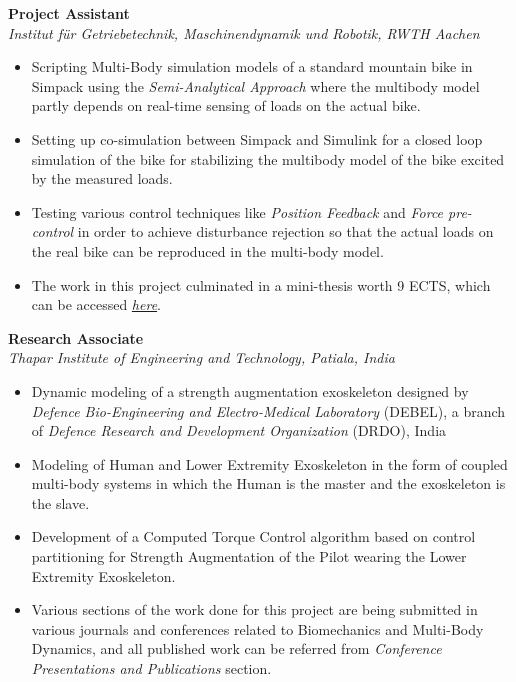 \vspace{0.1 in}

\large{\textbf{Project Assistant}}
\hfill
\minithesisdate\\
\emph{\large{Institut für Getriebetechnik, Maschinendynamik und Robotik, RWTH Aachen}}
\begin{itemize}
\item \large{Scripting Multi-Body simulation models of a standard mountain bike in Simpack using the \emph{Semi-Analytical Approach} where the multibody model partly depends on real-time sensing of loads on the actual bike.}
\item\large{Setting up co-simulation between Simpack and Simulink for a closed loop simulation of the bike for stabilizing the multibody model of the bike excited by the measured loads.}
\item\large{Testing various control techniques like \emph{Position Feedback} and \emph{Force pre-control} in order to achieve disturbance rejection so that the actual loads on the real bike can be reproduced in the multi-body model}.
\item\large{The work in this project culminated in a mini-thesis worth 9 ECTS, which can be accessed \href{https://github.com/average-engineer/MiniThesis_IGMR/blob/master/Thesis.pdf}{\large{\textit{here}}}.}
\end{itemize}

\vspace{0.1 in}

\large{\textbf{Research Associate}}
\hfill
\drdodate\\
\emph{\large{Thapar Institute of Engineering and Technology, Patiala, India}}
\begin{itemize}
\item \large{Dynamic modeling of a strength augmentation exoskeleton designed by \emph{Defence Bio-Engineering and Electro-Medical Laboratory} (DEBEL), a branch of \emph{Defence Research and Development Organization} (DRDO), India}
\item\large{Modeling of Human and Lower Extremity Exoskeleton in the form of coupled multi-body systems in which the Human is the master and the exoskeleton is the slave.}
\item\large{Development of a Computed Torque Control algorithm based on control partitioning for Strength Augmentation of the Pilot wearing the Lower Extremity Exoskeleton.}
\item\large{Various sections of the work done for this project are being submitted in various journals and conferences related to Biomechanics and Multi-Body Dynamics, and all published work can be referred from \emph{Conference Presentations and Publications} section.}
\end{itemize}

